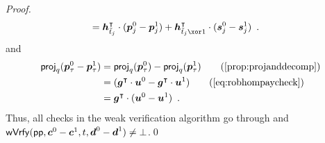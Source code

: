 \begin{proof}
\begin{align*}
    ={} &\vec{h}_{\tilde t_j}^\transpose\cdot (\vec{p}^0_{j} - \vec{p}^1_{j}) + \vec{h}_{\tilde t_j\xor 1}^\transpose \cdot (\vec{s}^0_{j} - \vec{s}^1_{j})\enspace.
  \end{align*}
  and
  \begin{align*}
    \projmod{q}(\vec{p}^0_{\tau}-\vec{p}^1_{\tau})
    ={} &\projmod{q}(\vec{p}^0_{\tau})-\projmod{q}(\vec{p}^1_{\tau})\tag{\autoref{prop:projanddecomp}}\\
    ={} &(\vec{g}^\transpose\cdot \vec{u}^0 - \vec{g}^\transpose \cdot \vec{u}^1)\tag{\autoref{eq:robhompaycheck}}\\
    ={} &\vec{g}^\transpose\cdot (\vec{u}^0 - \vec{u}^1)\enspace.
  \end{align*}
  Thus, all checks in the weak verification algorithm go through and $\mathsf{wVrfy}(\mathsf{pp},\boldsymbol{c}^0-\boldsymbol{c}^1, t,\boldsymbol{d}^0-\boldsymbol{d}^1)\neq\bot$.\qed
\end{proof}

